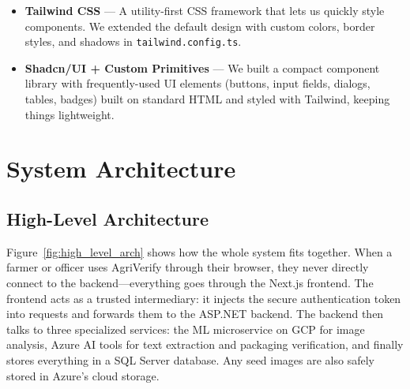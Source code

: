 \begin{itemize}
  \item \textbf{Tailwind CSS} — A utility-first CSS framework that lets us
        quickly style components. We extended the default design with custom
        colors, border styles, and shadows in \texttt{tailwind.config.ts}.

  \item \textbf{Shadcn/UI + Custom Primitives} — We built a compact component
        library with frequently-used UI elements (buttons, input fields, dialogs,
        tables, badges) built on standard HTML and styled with Tailwind, keeping
        things lightweight.
\end{itemize}

\section{System Architecture}

\subsection{High-Level Architecture}

Figure~\ref{fig:high_level_arch} shows how the whole system fits together. When
a farmer or officer uses AgriVerify through their browser, they never directly
connect to the backend—everything goes through the Next.js frontend. The
frontend acts as a trusted intermediary: it injects the secure authentication
token into requests and forwards them to the ASP.NET backend. The backend then
talks to three specialized services: the ML microservice on GCP for image
analysis, Azure AI tools for text extraction and packaging verification, and
finally stores everything in a SQL Server database. Any seed images are also
safely stored in Azure's cloud storage.

